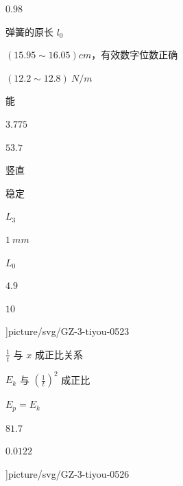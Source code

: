 \item $ 0.98 $
\item 弹簧的原长 $ l_{0} $
\item $ (15.95 \sim 16.05)cm $，有效数字位数正确
\item $ (12.2 \sim 12.8) \ N/m $
\item 能
\item $ 3.775 $
\item $ 53.7 $
\item 竖直
\item 稳定
\item $ L_{3} $
\item $ 1 \ mm $
\item $ L_{0} $
\item $ 4.9 $
\item $ 10 $
\item \linewidth ]{picture/svg/GZ-3-tiyou-0523}
\item $\frac {1}{t}$ 与 $x$ 成正比关系
\item $E_{k}$ 与 $\left (\frac {1}{t}\right )^{2}$ 成正比
\item $E_{p}=E_{k}$
\item $ 81.7 $
\item $ 0.0122 $
\item \linewidth ]{picture/svg/GZ-3-tiyou-0526}
